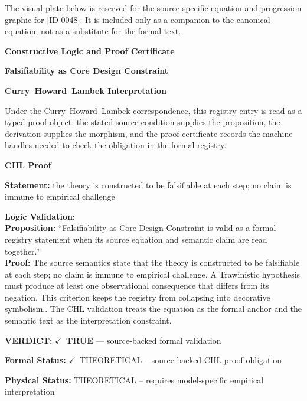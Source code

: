 \begingroup\footnotesize\sloppy
The visual plate below is reserved for the source-specific equation and progression graphic for [ID 0048]. It is included only as a companion to the canonical equation, not as a substitute for the formal text.
\par\endgroup
\ifTZPDarkEdition
{}
\fi

\clearpage
\begingroup\tzpsupportsetup
\noindent\textbf{\fontsize{10.8pt}{12.8pt}\selectfont [ID 0048] Constructive Logic and Proof Certificate}\par
\noindent\textbf{\fontsize{10pt}{12pt}\selectfont Falsifiability as Core Design Constraint}\par
\vspace{0.45em}
\begingroup
\footnotesize
\setlength{\parskip}{0.22em}
\setlength{\parindent}{0pt}
\noindent\textbf{Curry--Howard--Lambek Interpretation}\par
Under the Curry--Howard--Lambek correspondence, this registry entry is read as a typed proof
object: the stated source condition supplies the proposition, the derivation supplies the
morphism, and the proof certificate records the machine handles needed to check the obligation
in the formal registry.

\vspace{0.45em}
\noindent\textbf{CHL Proof}\par
\textbf{Statement:} the theory is constructed to be falsifiable at each step; no claim is immune to
empirical challenge

\textbf{Logic Validation:}\\
\textbf{Proposition:} ``Falsifiability as Core Design Constraint is valid as a formal registry statement when
its source equation and semantic claim are read together.''\\
\textbf{Proof:} The source semantics state that the theory is constructed to be falsifiable at each
step; no claim is immune to empirical challenge. A Trawinistic hypothesis must produce
at least one observational consequence that differs from its negation. This criterion
keeps the registry from collapsing into decorative symbolism.. The CHL validation treats
the equation as the formal anchor and the semantic text as the interpretation
constraint.

\textbf{VERDICT:} \ensuremath{\checkmark}\ \textbf{TRUE} --- source-backed formal validation

\textbf{Formal Status:} \ensuremath{\checkmark}\ THEORETICAL -- source-backed CHL proof obligation

\textbf{Physical Status:} THEORETICAL -- requires model-specific empirical interpretation
\par\vspace{0.45em}
\par
\ifTZPDarkEdition
{}
\fi
\endgroup
\endgroup
